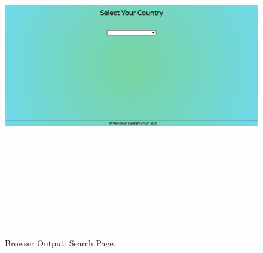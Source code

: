 \documentclass[12pt, a4]{article}
\begin{document}
\subsection*{}
\begin{figure}[h]
\centering
\caption{Browser Output: Search Page.}
\includegraphics[height=15cm, width=18cm]{Output/Autocomplete1.png}
\end{figure}

\newpage
\end{document}
